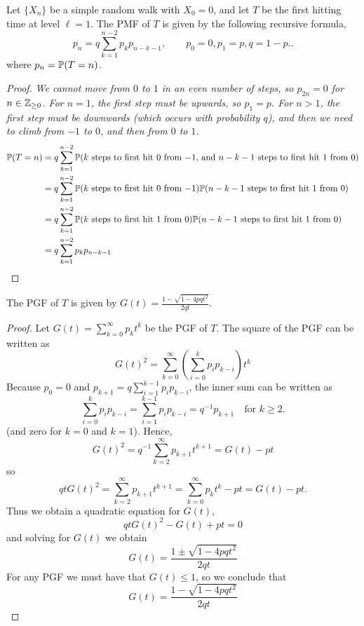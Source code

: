 
\begin{theorem}
Let $\{X_n\}$ be a simple random walk with $X_0=0$, and let $T$ be the first hitting time at level $\ell=1$. The PMF of $T$ is given by the following recursive formula,
\[
p_n = q\sum_{k=1}^{n-2}p_{k}p_{n-k-1}, \qquad p_0=0, p_1=p, q=1-p..
\]
where $p_n = \mathbb{P}(T=n)$.
\end{theorem}
\begin{proof}
\bit
\it We cannot move from $0$ to $1$ in an even number of steps, so $p_{2n}=0$ for $n\in\mathbb{Z}_{\geq 0}$.
\it For $n=1$, the first step must be upwards, so $p_1=p$.
\it For $n>1$, the first step must be downwards (which occurs with probability $q$), and then we need to climb from $-1$ to $0$, and then from $0$ to $1$. 
\eit
\begin{align*}
\mathbb{P}(T=n)
	& = q\sum_{k=1}^{n-2}\mathbb{P}(\text{$k$ steps to first hit $0$ from $-1$, and $n-k-1$ steps to first hit 1 from $0$}) \\
	& = q\sum_{k=1}^{n-2}\mathbb{P}(\text{$k$ steps to first hit $0$ from $-1$})\mathbb{P}(\text{$n-k-1$ steps to first hit $1$ from $0$}) \\
	& = q\sum_{k=1}^{n-2}\mathbb{P}(\text{$k$ steps to first hit $1$ from $0$})\mathbb{P}(\text{$n-k-1$ steps to first hit $1$ from $0$}) \\
	& = q\sum_{k=1}^{n-2}p_{k}p_{n-k-1}
\end{align*}
\end{proof}

\begin{theorem}
The PGF of $T$ is given by $\displaystyle G(t) = \frac{1 - \sqrt{1-4pqt^2}}{2qt}$.
\end{theorem}

\begin{proof}
Let $G(t) = \sum_{k=0}^{\infty} p_k t^k$ be the PGF of $T$. The square of the PGF can be written as 
\[
G(t)^2 = \sum_{k=0}^{\infty} \left(\sum_{i=0}^{k} p_ip_{k-i}\right) t^k
\]
Because $p_0=0$ and $p_{k+1}=q\sum_{i=1}^{k-1}p_{i}p_{k-i}$, the inner sum can be written as
\[ 
\sum_{i=0}^{k} p_ip_{k-i} 
	= \sum_{i=1}^{k-1} p_ip_{k-i} 
	=  q^{-1}p_{k+1} \quad\text{for $k\geq 2$.}
\]
(and zero for $k=0$ and $k=1$). Hence,
\[
G(t)^2 = q^{-1}\sum_{k=2}^{\infty} p_{k+1} t^{k+1} = G(t) - pt
\]
so
\[
qtG(t)^2 = \sum_{k=2}^{\infty} p_{k+1} t^{k+1} = \sum_{k=0}^{\infty} p_k t^k - pt = G(t) - pt.
\]
Thus we obtain a quadratic equation for $G(t)$,
\[
qtG(t)^2 - G(t) + pt = 0
\]
and solving for $G(t)$ we obtain
\[
G(t) = \frac{1\pm\sqrt{1-4pqt^2}}{2qt}
\]
For any PGF we must have that $G(t)\leq 1$, so we conclude that
\[
G(t) = \frac{1 - \sqrt{1-4pqt^2}}{2qt}
\]
\end{proof}

